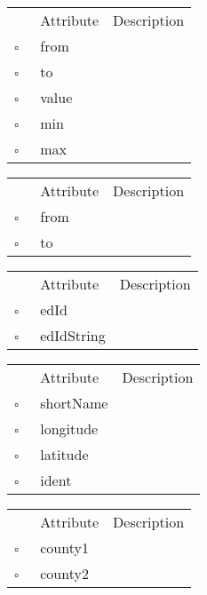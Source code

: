 \begin{table}
\caption{Distance  }

\begin{longtable}{llp{8cm}}
& Attribute & Description \\
$\square$\ & from &  \\
$\square$\ & to &  \\
$\square$\ & value &  \\
$\square$\ & min &  \\
$\square$\ & max &  \\
\end{longtable}
\label{attr:Distance}
\end{table}

\begin{table}
\caption{DistanceError  }

\begin{longtable}{llp{8cm}}
& Attribute & Description \\
$\square$\ & from &  \\
$\square$\ & to &  \\
\end{longtable}
\label{attr:DistanceError}
\end{table}

\clearpage
\begin{table}
\caption{ElectoralDivision  }

\begin{longtable}{llp{8cm}}
& Attribute & Description \\
$\square$\ & edId &  \\
$\square$\ & edIdString &  \\
\end{longtable}
\label{attr:ElectoralDivision}
\end{table}

\begin{table}
\caption{MapLocation  }

\begin{longtable}{llp{8cm}}
& Attribute & Description \\
$\square$\ & shortName &  \\
$\square$\ & longitude &  \\
$\square$\ & latitude &  \\
$\square$\ & ident &  \\
\end{longtable}
\label{attr:MapLocation}
\end{table}

\begin{table}
\caption{NeighborCounty  }

\begin{longtable}{llp{8cm}}
& Attribute & Description \\
$\square$\ & county1 &  \\
$\square$\ & county2 &  \\
\end{longtable}
\label{attr:NeighborCounty}
\end{table}

